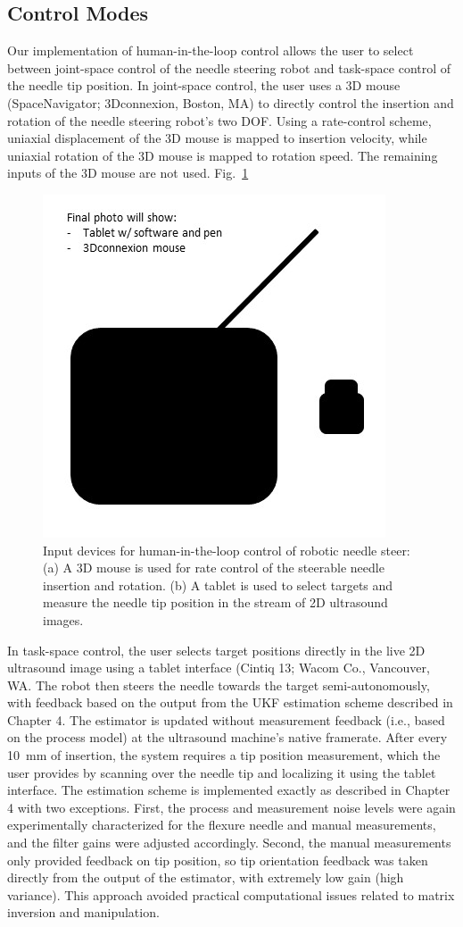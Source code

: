 \subsection{Control Modes}
Our implementation of human-in-the-loop control allows the user to select between joint-space control of the needle steering robot and task-space control of the needle tip position. In joint-space control, the user uses a 3D mouse (SpaceNavigator; 3Dconnexion, Boston, MA) to directly control the insertion and rotation of the needle steering robot's two DOF. Using a rate-control scheme, uniaxial displacement of the 3D mouse is mapped to insertion velocity, while uniaxial rotation of the 3D mouse is mapped to rotation speed. The remaining inputs of the 3D mouse are not used. Fig.~\ref{fig:InputDevices}

\begin{figure}[!t]
\centering
\includegraphics[width = 0.4\columnwidth]{./Images/Chapter5/InputDevices/DRAFTInputDevices.jpg}%
\caption[Input devices for robot control]{Input devices for human-in-the-loop control of robotic needle steer: (a) A 3D mouse is used for rate control of the steerable needle insertion and rotation. (b) A tablet is used to select targets and measure the needle tip position in the stream of 2D ultrasound images.}
\label{fig:InputDevices}
\end{figure}  

In task-space control, the user selects target positions directly in the live 2D ultrasound image using a tablet interface (Cintiq 13; Wacom Co., Vancouver, WA. The robot then steers the needle towards the target semi-autonomously, with feedback based on the output from the UKF estimation scheme described in Chapter 4. The estimator is updated without measurement feedback (i.e., based on the process model) at the ultrasound machine's native framerate. After every 10~mm of insertion, the system requires a tip position measurement, which the user provides by scanning over the needle tip and localizing it using the tablet interface. The estimation scheme is implemented exactly as described in Chapter 4 with two exceptions. First, the process and measurement noise levels were again experimentally characterized for the flexure needle and manual measurements, and the filter gains were adjusted accordingly. Second, the manual measurements only provided feedback on tip position, so tip orientation feedback was taken directly from the output of the estimator, with extremely low gain (high variance). This approach avoided practical computational issues related to matrix inversion and manipulation.

